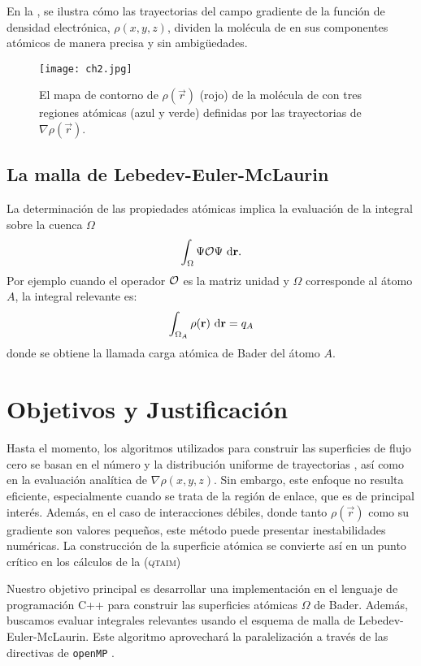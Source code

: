 	En la  , se ilustra cómo las trayectorias del campo gradiente de la función de densidad electrónica, $\rho(x,y,z)$, 
	dividen la molécula de  en sus componentes atómicos de manera precisa y sin ambigüedades.
	\begin{figure}[!ht] 
		\centering
		\texttt{[image: ch2.jpg]}
	\caption{El mapa de contorno de $\rho(\vec{r})$ (rojo) de la molécula 
	de  con tres regiones atómicas (azul y verde) definidas por las 
	trayectorias de $\nabla\rho(\vec{r})$.}
	\label{fig:ch2fig}
	\end{figure}	
	
	\subsection{La malla de Lebedev-Euler-McLaurin}
	La determinación de las propiedades atómicas implica la evaluación de la integral
	sobre la cuenca $\Omega$ 
	\begin{equation*}
		\int_\Omega\Psi{\cal O}\Psi\ \df{d}\vec{r}.
	\end{equation*}	
	Por ejemplo cuando el operador $\cal O$ es la matriz unidad y $\Omega$ 
	corresponde al átomo $A$, la integral relevante es:
	\begin{equation*}
		\int_{\Omega_A}\rho(\vec{r})\ \df{d}\vec{r} = q_A
	\end{equation*}
	donde se obtiene la llamada carga atómica de Bader del átomo $A$. 

	\section{Objetivos y Justificación}
    Hasta el momento, los algoritmos utilizados para construir las superficies de flujo cero se basan en el 
    número y la distribución uniforme de trayectorias 	\cite{biegler1981,popelier96}, así como en la evaluación 
    analítica de $\nabla\rho(x,y,z)$. Sin embargo, este enfoque no resulta eficiente, especialmente 
    cuando se trata de la región de enlace, que es de principal interés. Además, en el caso de interacciones débiles, 
    donde tanto $\rho(\vec{r})$ como su gradiente son valores pequeños, este método puede presentar inestabilidades
     numéricas. La construcción de la superficie atómica se convierte así en un punto crítico en los cálculos 
     de la (\textsc{qtaim})

	Nuestro objetivo principal es desarrollar una  implementación en el lenguaje de programación C++
	para construir las superficies atómicas  $\Omega$ de Bader.  Además, buscamos evaluar integrales 
	relevantes usando el esquema de malla de Lebedev-Euler-McLaurin. Este algoritmo aprovechará la 
	paralelización a través de las directivas de \texttt{openMP} \cite{openmp}.
%
